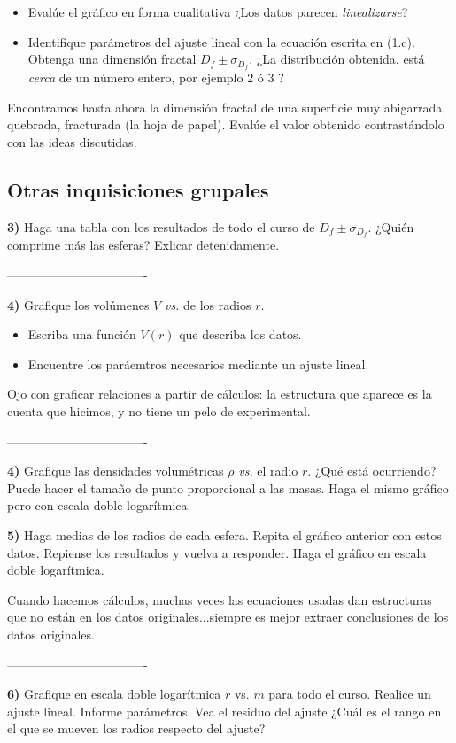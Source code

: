 \documentclass[10pt,a4paper]{article}
\numberwithin{equation}{section}
\begin{document}
\begin{itemize}
\item[a)] Evalúe el gráfico en forma cualitativa ¿Los datos parecen \textit{linealizarse}?
\item[b)]  Identifique parámetros del ajuste lineal con la ecuación escrita en (1.c). Obtenga una dimensión fractal $D_f \pm \sigma_{D_f}$. ¿La distribución obtenida, está \textit{cerca} de un número entero, por ejemplo 2 ó 3 ?
\end{itemize}

Encontramos hasta ahora la dimensión fractal de una superficie muy abigarrada, quebrada, fracturada (la hoja de papel). Evalúe el valor obtenido contrastándolo con las ideas discutidas.



\subsection*{Otras inquisiciones grupales}

\noindent \textbf{3)} Haga una tabla con los resultados de todo el curso de $D_f \pm \sigma_{D_f}$. ¿Quién comprime más las esferas? Exlicar detenidamente.

\-----------------------------------


\noindent \textbf{4)} Grafique los volúmenes $V$ \textit{vs.} de los radios $r$.

\begin{itemize}
\item[a)] Escriba una función $V(r)$ que describa los datos.
\item[b)] Encuentre los paráemtros necesarios mediante un ajuste lineal.
\end{itemize}

Ojo con graficar relaciones a partir de cálculos: la estructura que aparece es la cuenta que hicimos, y no tiene un pelo de experimental.

\-----------------------------------

\noindent \textbf{4)} Grafique las densidades volumétricas $\rho$ \textit{vs.} el radio $r$. ¿Qué está ocurriendo? Puede hacer el tamaño de punto proporcional a las masas. Haga el mismo gráfico pero con escala doble logarítmica.
\-----------------------------------

\noindent \textbf{5)} Haga medias de los radios de cada esfera. Repita el gráfico anterior con estos datos. Repiense los resultados y vuelva a responder. Haga el gráfico en escala doble logarítmica.

Cuando hacemos cálculos, muchas veces las ecuaciones usadas dan estructuras que no están en los datos originales...siempre es mejor extraer conclusiones de los datos originales.

\-----------------------------------

\noindent \textbf{6)} Grafique en escala doble logarítmica $r$ vs. $m$ para todo el curso. Realice un ajuste lineal. Informe parámetros. Vea el residuo del ajuste ¿Cuál es el rango en el que se mueven los radios respecto del ajuste?
\end{document}
